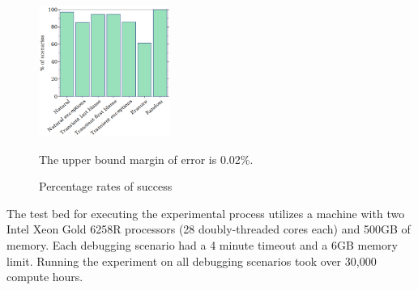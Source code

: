 
\begin{figure} \footnotesize 
  \vspace{-1.5em}
  \includegraphics[width=0.38\textwidth]{./plots/success-bars}
  \vspace{1em}
  \begin{minipage}{0.35\textwidth} \raggedright
   The upper bound margin of error is 0.02\%.
  \end{minipage}
\vspace{-2em}
  \caption{Percentage rates of success} \label{fig:success-bars}
\end{figure}

The test bed for executing the experimental process utilizes a machine with two
Intel Xeon Gold 6258R processors (28 doubly-threaded cores each) and 500GB of
memory.  Each debugging scenario had a 4 minute timeout and a 6GB memory
limit. Running the experiment on all debugging scenarios took over
30,000 compute hours.

